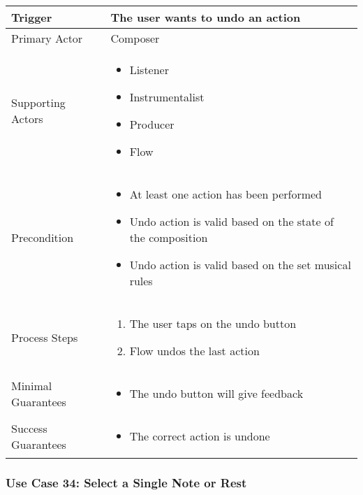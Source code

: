 \begin{tabularx}{\textwidth}{|X|X|}
\hline
Trigger & 
The user wants to undo an action \\
\hline
Primary Actor & 
Composer \\
\hline
Supporting Actors & 
\begin{itemize}
\item Listener
\item Instrumentalist
\item Producer
\item Flow
\end{itemize} \\
\hline
Precondition & 
\begin{itemize}
\item At least one action has been performed
\item Undo action is valid based on the state of the composition
\item Undo action is valid based on the set musical rules
\end{itemize} \\
\hline
Process Steps & 
\begin{enumerate}
\item The user taps on the undo button
\item Flow undos the last action
\end{enumerate} \\
\hline
Minimal Guarantees & 
\begin{itemize}
  \item The undo button will give feedback
\end{itemize} \\
\hline
Success Guarantees & 
\begin{itemize}
  \item The correct action is undone
\end{itemize} \\
\hline
\end{tabularx}

\subsubsection{Use Case 34: Select a Single Note or Rest}

